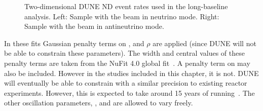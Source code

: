 \begin{figure}[h]
	\begin{minipage}[t]{.5\linewidth}
		\begin{adjustbox}{max totalsize=\linewidth, center}
			
		\end{adjustbox}
	\end{minipage}
	\hfill
	\begin{minipage}[t]{.5\linewidth}
		\begin{adjustbox}{max totalsize=\linewidth, center}
			
		\end{adjustbox}
	\end{minipage}
	\caption[Two-dimensional DUNE ND event rates used in the long-baseline analysis]{Two-dimensional DUNE ND event rates used in the long-baseline analysis. Left: Sample with the beam in neutrino mode. Right: Sample with the beam in antineutrino mode.}
	\label{fig:ndEventRates}
\end{figure}

In these fits Gaussian penalty terms on ,  and $\rho$ are applied (since DUNE will not be able to constrain these parameters).
The width and central values of these penalty terms are taken from the NuFit 4.0 global fit~\cite{nufit4}.
A penalty term on  may also be included.
However in the studies included in this chapter, it is not.
DUNE will eventually be able to constrain  with a similar precision to existing reactor experiments. 
However, this is expected to take around 15 years of running~\cite{tdrVol2}.
The other oscillation parameters, ,  and \dcp are allowed to vary freely.

